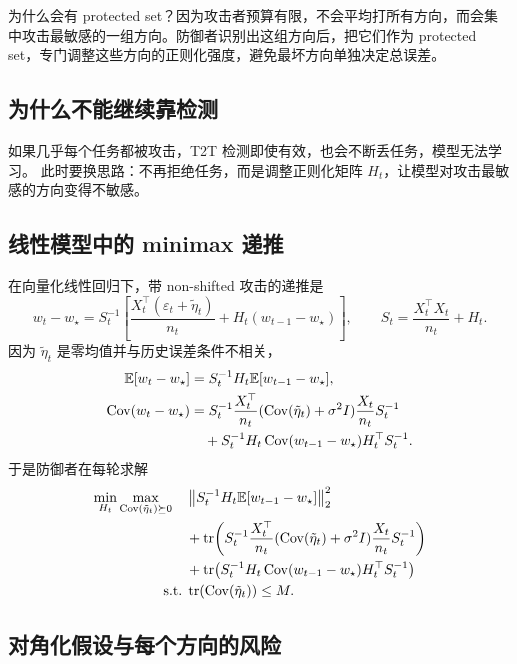 \documentclass[UTF8,fontset=none,11pt]{ctexart}
\theoremstyle{cnstyle}
\newcommand{\E}{\mathbb{E}}
\newcommand{\Cov}{\operatorname{Cov}}
\newcommand{\tr}{\operatorname{tr}}
\newcommand{\norm}[1]{\left\lVert #1\right\rVert}
\newcommand{\st}{\;\mathrm{s.t.}\;}
\begin{document}
为什么会有 protected set？因为攻击者预算有限，不会平均打所有方向，而会集中攻击最敏感的一组方向。防御者识别出这组方向后，把它们作为 protected set，专门调整这些方向的正则化强度，避免最坏方向单独决定总误差。

\subsection{为什么不能继续靠检测}

如果几乎每个任务都被攻击，T2T 检测即使有效，也会不断丢任务，模型无法学习。
此时要换思路：不再拒绝任务，而是调整正则化矩阵 \(H_t\)，让模型对攻击最敏感的方向变得不敏感。

\subsection{线性模型中的 minimax 递推}

在向量化线性回归下，带 non-shifted 攻击的递推是
\begin{equation}
  w_t-w_\star
  =
  S_t^{-1}
  \left[
  \frac{X_t^\top(\varepsilon_t+\tilde\eta_t)}{n_t}
  +H_t(w_{t-1}-w_\star)
  \right],
  \qquad
  S_t=\frac{X_t^\top X_t}{n_t}+H_t .
  \label{eq:rfd-recursion}
\end{equation}
因为 \(\tilde\eta_t\) 是零均值并与历史误差条件不相关，
\begin{align}
  \E[w_t-w_\star]
  &=
  S_t^{-1}H_t\E[w_{t-1}-w_\star],
  \label{eq:rfd-mean}\\
  \Cov(w_t-w_\star)
  &=
  S_t^{-1}\frac{X_t^\top}{n_t}
  (\Cov(\tilde\eta_t)+\sigma^2I)
  \frac{X_t}{n_t}S_t^{-1}
  \notag\\
  &\quad+
  S_t^{-1}H_t\Cov(w_{t-1}-w_\star)H_t^\top S_t^{-1}.
  \label{eq:rfd-cov}
\end{align}
于是防御者在每轮求解
\begin{align}
  \min_{H_t}\max_{\Cov(\tilde\eta_t)\succeq0}\quad
  &
  \norm{S_t^{-1}H_t\E[w_{t-1}-w_\star]}_2^2
  \notag\\
  &+
  \tr\!\left(
  S_t^{-1}\frac{X_t^\top}{n_t}
  (\Cov(\tilde\eta_t)+\sigma^2I)
  \frac{X_t}{n_t}S_t^{-1}
  \right)
  \notag\\
  &+
  \tr\!\left(
  S_t^{-1}H_t\Cov(w_{t-1}-w_\star)H_t^\top S_t^{-1}
  \right)
  \notag\\
  \st&
  \tr(\Cov(\tilde\eta_t))\le M .
  \label{eq:rfd-minimax}
\end{align}

\subsection{对角化假设与每个方向的风险}
\end{document}
